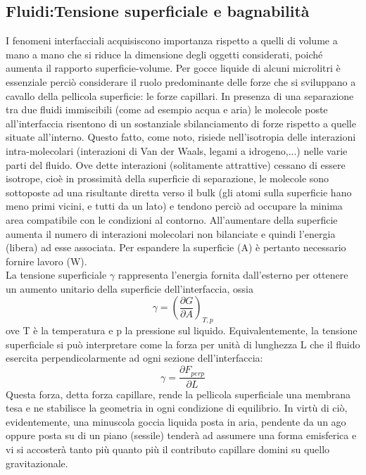 \documentclass[letterpaper,12pt]{article}
\begin{document}
\subsection{Fluidi:Tensione superficiale e bagnabilità}
I fenomeni interfacciali acquisiscono importanza rispetto a quelli di volume a mano a mano che si riduce la dimensione degli oggetti considerati, poiché aumenta il rapporto superficie-volume. Per gocce liquide di alcuni microlitri è essenziale perciò considerare il ruolo predominante delle forze che si sviluppano a cavallo della pellicola superficie: le forze capillari. In presenza di una separazione tra due fluidi immiscibili (come ad esempio acqua e aria) le molecole poste all'interfaccia risentono di un sostanziale sbilanciamento di forze rispetto a quelle situate all'interno. Questo fatto, come noto, risiede nell'isotropia delle interazioni intra-molecolari (interazioni di Van der Waals, legami a idrogeno,...) nelle varie parti del fluido. Ove dette interazioni (solitamente attrattive) cessano di essere isotrope, cioè in prossimità della superficie di separazione, le molecole sono sottoposte ad una risultante diretta verso il bulk (gli atomi sulla superficie hano meno primi vicini, e tutti da un lato) e tendono perciò ad occupare la minima area compatibile con le condizioni al contorno. All'aumentare della superficie aumenta il numero di interazioni molecolari non bilanciate e quindi l'energia (libera) ad esse associata. Per espandere la superficie (A) è pertanto necessario fornire lavoro (W). \\
La tensione superficiale $\gamma$ rappresenta l'energia fornita dall'esterno per ottenere un aumento unitario della superficie dell'interfaccia, ossia 
\begin{equation}
	\gamma=(\frac{\partial G}{\partial A})_{T,p}
\end{equation}
ove T è la temperatura e p la pressione sul liquido. Equivalentemente, la tensione superficiale si può interpretare come la forza per unità di lunghezza L che il fluido esercita perpendicolarmente ad ogni sezione dell'interfaccia: 
\begin{equation}
\gamma=\frac{\partial F_{perp}}{\partial L}
\end{equation}
Questa forza, detta forza capillare, rende la pellicola superficiale una membrana tesa e ne stabilisce la geometria in ogni condizione di equilibrio. In virtù di ciò, evidentemente, una minuscola goccia liquida posta in aria, pendente da un ago oppure posta su di un piano (sessile) tenderà ad assumere una forma emisferica e vi si accosterà tanto più quanto più il contributo capillare domini su quello gravitazionale.\\
\end{document}
